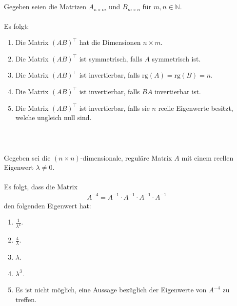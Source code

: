 \subsection*{}
Gegeben seien die Matrizen $ A_{n \times m} $ und $ B_{m \times n} $ für $ m,n \in \mathbb{N} $.\\
\\
Es folgt:
\renewcommand{\labelenumi}{(\alph{enumi})}
\begin{enumerate}
\item 
Die Matrix $ (AB)^\top $ hat die Dimensionen $ n \times m $.
\item 
Die Matrix $ (AB)^\top $ ist symmetrisch, falls $ A $ symmetrisch ist.
\item 
Die Matrix $ (AB)^\top $ ist invertierbar, falls $ \mathrm{rg}(A) = \mathrm{rg}(B) = n $.
\item 
Die Matrix $ (AB)^\top $ ist invertierbar, falls $ BA $ invertierbar ist.
\item 
Die Matrix $ (AB)^\top $ ist invertierbar, falls sie $ n $ reelle Eigenwerte besitzt, welche ungleich null sind.
\end{enumerate}
\ \\
\subsection*{}
Gegeben sei die $ (n \times n ) $-dimensionale, reguläre Matrix $ A $ mit einem reellen Eigenwert $ \lambda \neq 0 $.\\
\\
Es folgt, dass die Matrix
\begin{align*}
	A^{-4} = A^{-1} \cdot A^{-1} \cdot A^{-1} \cdot A^{-1}
\end{align*}
den folgenden Eigenwert hat:
\renewcommand{\labelenumi}{(\alph{enumi})}
\begin{enumerate}
	\item 
	$ \frac{1}{\lambda^4} $.
	\item 
	$ \frac{4}{\lambda} $.
	\item
	$ \lambda$.
	\item
	$\lambda^3 $.
	\item 
	Es ist nicht möglich, eine Aussage bezüglich der Eigenwerte von $ A^{-4} $ zu treffen.
\end{enumerate}
\ \\

